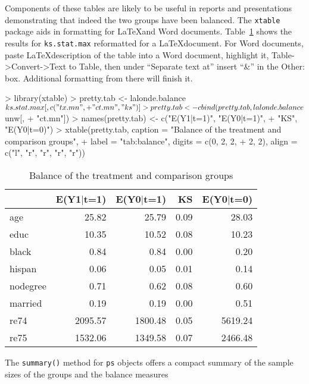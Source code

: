 \documentclass{article}
\begin{document}
Components of these tables are likely to be useful in reports and presentations
demonstrating that indeed the two groups have been balanced. The
\texttt{xtable} package aids in formatting for \LaTeX and Word documents.
Table~\ref{tab:balance} shows the results for \texttt{ks.stat.max} reformatted
for a \LaTeX document. For Word documents, paste \LaTeX description of the
table into a Word document, highlight it, Table->Convert->Text to Table, then
under ``Separate text at'' insert ``\&'' in the Other: box. Additional
formatting from there will finish it.

\begin{Schunk}
\begin{Sinput}
> library(xtable)
> pretty.tab <- lalonde.balance$ks.stat.max[, c("tx.mn", 
+     "ct.mn", "ks")]
> pretty.tab <- cbind(pretty.tab, lalonde.balance$unw[, 
+     "ct.mn"])
> names(pretty.tab) <- c("E(Y1|t=1)", "E(Y0|t=1)", 
+     "KS", "E(Y0|t=0)")
> xtable(pretty.tab, caption = "Balance of the treatment and comparison groups", 
+     label = "tab:balance", digits = c(0, 2, 2, 
+         2, 2), align = c("l", "r", "r", "r", "r"))
\end{Sinput}
% latex table generated in R 2.2.1 by xtable 1.3-1 package
% Wed Apr 12 20:51:36 2006
\begin{table}[ht]
\begin{center}
\begin{tabular}{lrrrr}
\hline
 & E(Y1$|$t=1) & E(Y0$|$t=1) & KS & E(Y0$|$t=0) \\
\hline
age & 25.82 & 25.79 & 0.09 & 28.03 \\
educ & 10.35 & 10.52 & 0.08 & 10.23 \\
black & 0.84 & 0.84 & 0.00 & 0.20 \\
hispan & 0.06 & 0.05 & 0.01 & 0.14 \\
nodegree & 0.71 & 0.62 & 0.08 & 0.60 \\
married & 0.19 & 0.19 & 0.00 & 0.51 \\
re74 & 2095.57 & 1800.48 & 0.05 & 5619.24 \\
re75 & 1532.06 & 1349.58 & 0.07 & 2466.48 \\
\hline
\end{tabular}
\caption{Balance of the treatment and comparison groups}
\label{tab:balance}
\end{center}
\end{table}\end{Schunk}

The \texttt{summary()} method for \texttt{ps} objects offers a compact summary
of the sample sizes of the groups and the balance measures
\end{document}
